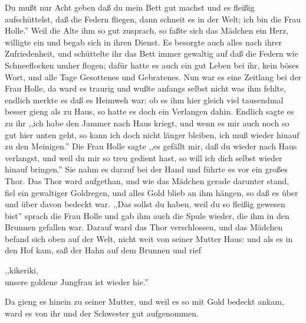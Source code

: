 \documentclass[10pt,a4paper]{article}
\begin{document}
Du mußt nur Acht geben daß du mein Bett gut machst und es fleißig aufschüttelst,
daß die Federn fliegen, dann schneit es in der Welt; ich bin die Frau Holle.''
Weil die Alte ihm so gut zusprach, so faßte sich das Mädchen ein Herz, willigte
ein und begab sich in ihren Dienst. Es besorgte auch alles nach ihrer
Zufriedenheit, und schüttelte ihr das Bett immer gewaltig auf daß die Federn wie
Schneeflocken umher flogen; dafür hatte es auch ein gut Leben bei ihr, kein
böses Wort, und alle Tage Gesottenes und Gebratenes. Nun war es eine Zeitlang
bei der Frau Holle, da ward es traurig und wußte anfangs selbst nicht was ihm
fehlte, endlich merkte es daß es Heimweh war; ob es ihm hier gleich viel
tausendmal besser gieng als zu Haus, so hatte es doch ein Verlangen dahin.
Endlich sagte es zu ihr ,,ich habe den Jammer nach Haus kriegt, und wenn es mir
auch noch so gut hier unten geht, so kann ich doch nicht länger bleiben, ich muß
wieder hinauf zu den Meinigen.'' Die Frau Holle sagte ,,es gefällt mir, daß du
wieder nach Haus verlangst, und weil du mir so treu gedient hast, so will ich
dich selbst wieder hinauf bringen.'' Sie nahm es darauf bei der Hand und führte
es vor ein großes Thor. Das Thor ward aufgethan, und wie das Mädchen gerade
darunter stand, fiel ein gewaltiger Goldregen, und alles Gold blieb an ihm
hängen, so daß es über und über davon bedeckt war. ,,Das sollst du haben, weil
du so fleißig gewesen bist'' sprach die Frau Holle und gab ihm auch die Spule
wieder, die ihm in den Brunnen gefallen war. Darauf ward das Thor verschlossen,
und das Mädchen befand sich oben auf der Welt, nicht weit von seiner Mutter
Haus: und als es in den Hof kam, saß der Hahn auf dem Brunnen und rief

\vskip 4pt
,,kikeriki, \\
unsere goldene Jungfrau ist wieder hie.''

\vskip 4pt
Da gieng es hinein zu seiner Mutter, und weil es so mit Gold bedeckt ankam, ward
es von ihr und der Schwester gut aufgenommen.
\end{document}
